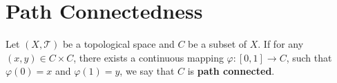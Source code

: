 \section{Path Connectedness}
\begin{definitionenv}
    Let $(X,\mathscr{T})$ be a topological space and $C$ be a subset of $X$. If for any $(x,y)\in C\times C$, there exists a continuous mapping $\varphi: [0,1]\longrightarrow C$, such that $\varphi(0)=x$ and $\varphi(1)=y$, we say that $C$ is \textbf{path connected}.

    \begin{figure}[H]
        \centering



\begin{tikzpicture}[x=0.75pt,y=0.75pt,yscale=-0.75,xscale=0.75]


\end{tikzpicture}
\end{figure}
\end{definitionenv}
